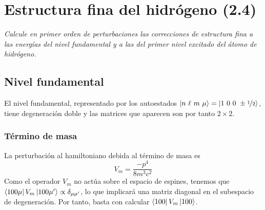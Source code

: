 \chapter{Estructura fina del hidrógeno (2.4)}
\begin{tcolorbox}[halign=left]
  \emph{Calcule en primer orden de perturbaciones las correcciones de
    estructura fina a las energías del nivel fundamental y a las del primer
    nivel excitado del átomo de hidrógeno.}
\end{tcolorbox}
\section{Nivel fundamental}
El nivel fundamental, representado por los autoestados
$\ket{n\ \ell\ m\ \mu}=\ket{1\ 0\ 0\ \pm\oh}$, tiene degeneración
doble y las matrices que aparecen son por tanto $2\times2$.
\subsection{Término de masa}
La perturbación al hamiltoniano debida al término de masa es
\begin{equation}
  V_m = \frac{-p^4}{8m^3c^2}
  \label{eq:vm}
\end{equation}
Como el operador $V_m$ no actúa sobre el espacio de espines, tenemos
que $\bra{100\mu}V_m\ket{100\mu'}\propto \delta_{\mu\mu'}$, lo que implicará
una matriz diagonal en el subespacio de degeneración. Por tanto, basta
con calcular $\bra{100}V_m\ket{100}$.

